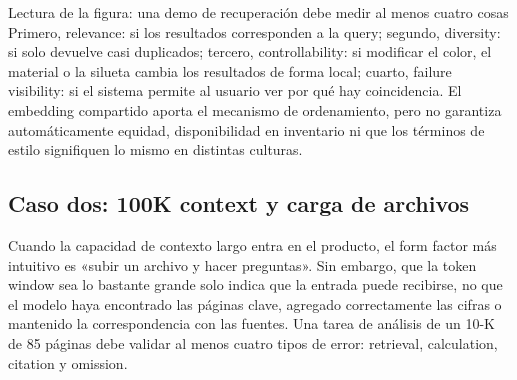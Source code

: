 


\begin{knowledgebox}{Lectura de la figura: una demo de recuperación debe medir al menos cuatro cosas}
Primero, relevance: si los resultados corresponden a la query; segundo, diversity: si solo devuelve casi duplicados; tercero, controllability: si modificar el color, el material o la silueta cambia los resultados de forma local; cuarto, failure visibility: si el sistema permite al usuario ver por qué hay coincidencia. El embedding compartido aporta el mecanismo de ordenamiento, pero no garantiza automáticamente equidad, disponibilidad en inventario ni que los términos de estilo signifiquen lo mismo en distintas culturas.
\end{knowledgebox}

\subsection{Caso dos: 100K context y carga de archivos}

Cuando la capacidad de contexto largo entra en el producto, el form factor más intuitivo es «subir un archivo y hacer preguntas». Sin embargo, que la token window sea lo bastante grande solo indica que la entrada puede recibirse, no que el modelo haya encontrado las páginas clave, agregado correctamente las cifras o mantenido la correspondencia con las fuentes. Una tarea de análisis de un 10-K de 85 páginas debe validar al menos cuatro tipos de error: retrieval, calculation, citation y omission.



